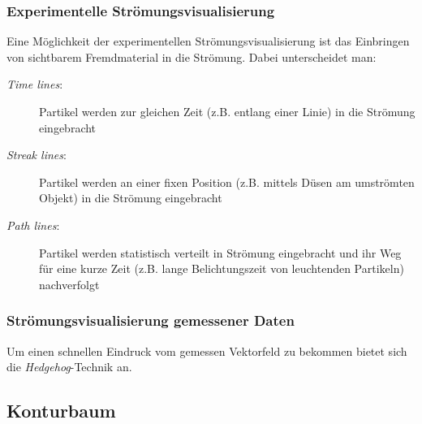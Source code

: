 \documentclass[12pt,a4paper,oneside,normalheadings,abstracton,liststotoc,bibtotoc,titlepage,pdftex]{scrbook}
\begin{document}
\subsubsection{Experimentelle Strömungsvisualisierung}
Eine Möglichkeit der experimentellen Strömungsvisualisierung ist das Einbringen von sichtbarem Fremdmaterial in die Strömung. Dabei unterscheidet man:
\begin{description}
\item[\textit{Time lines}:] Partikel werden zur gleichen Zeit (z.B. entlang einer Linie) in die Strömung eingebracht
\item[\textit{Streak lines}:] Partikel werden an einer fixen Position (z.B. mittels Düsen am umströmten Objekt) in die Strömung eingebracht
\item[\textit{Path lines}:] Partikel werden statistisch verteilt in Strömung eingebracht und ihr Weg für eine kurze Zeit (z.B. lange Belichtungszeit von leuchtenden Partikeln) nachverfolgt
\end{description}

\subsubsection{Strömungsvisualisierung gemessener Daten}
Um einen schnellen Eindruck vom gemessen Vektorfeld zu bekommen bietet sich die \textit{Hedgehog}-Technik an.

\subsection{Konturbaum}
\end{document}
